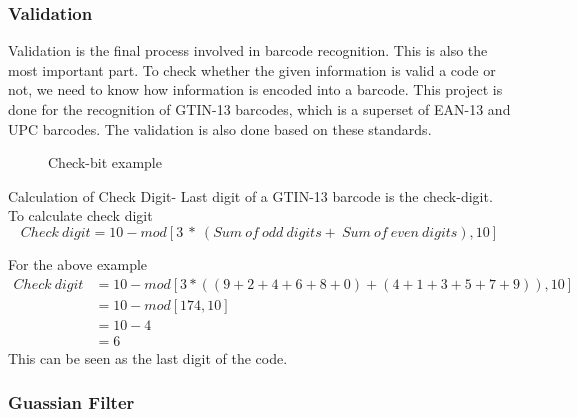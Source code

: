 \documentclass[times, 1pt, a4paper]{article}
\begin{document}
\subsubsection*{Validation} \label{subsubsection:validation}

Validation is the final process involved in barcode recognition. This is also the most important part. To check whether the given information is valid a code or not, we need to know how information is encoded into a barcode. This project is done for the recognition of GTIN-13 barcodes, which is a superset of EAN-13 and UPC barcodes. The validation is also done based on these standards.

  \begin{figure}[h] 
	\centering
	\centering
	\caption{Check-bit example}
	\label{fig:checkbit}
	\end{figure}


Calculation of Check Digit-
Last digit of a GTIN-13 barcode is the check-digit. To calculate check digit
$$ Check\ digit = 10 - mod \left[ 3\ *\ \left(Sum\ of\ odd\ digits + \ Sum\ of\ even\ digits \right),10 \right] $$

For the above example
\begin{equation}
\begin{split}
Check\ digit & = 10 - mod [ 3 * ((9+2+4+6+8+0) + (4+1+3+5+7+9)), 10] \\
               & = 10 - mod [174,10] \\
                & = 10 - 4 \\
                 & = 6               
\end{split}
\end{equation}
This can be seen as the last digit of the code.

\subsubsection*{Guassian Filter} \label{subsubsection:guassian_filter}
\end{document}
